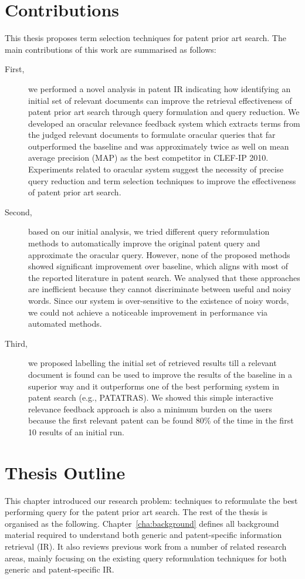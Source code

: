 \section{Contributions}
\label{sec:Contributions}
This thesis proposes term selection techniques for patent prior art search.
The main contributions of this work are summarised as follows:
\begin{description}
\item[First,] we performed a novel analysis in patent IR indicating how identifying 
an initial set of relevant documents can improve the retrieval effectiveness of 
patent prior art search through query formulation and query reduction. 
We developed an oracular relevance feedback system which extracts terms from the 
judged relevant documents to formulate oracular queries that far outperformed the 
baseline and  was approximately twice 
as well on mean average precision (MAP) as the best competitor in CLEF-IP 2010. 
Experiments related to oracular system suggest the necessity of precise query reduction 
and term selection techniques to improve the effectiveness of patent prior art search.
\item[Second,] based on our initial analysis, we tried different query reformulation methods to 
automatically improve the original patent query and approximate the oracular query. 
However, none of the proposed methods showed significant improvement over baseline, 
which aligns with most of the reported literature in patent search. 
We analysed that these approaches are inefficient because they cannot discriminate between 
useful and noisy words. Since our system is over-sensitive to the existence of noisy words, 
we could not achieve a noticeable improvement in performance via automated methods.
\item[Third,] we proposed labelling the initial set of retrieved results till a relevant document is 
found can be used to improve the results of the baseline in a superior way and it outperforms one of the 
best performing system in patent search (e.g., PATATRAS).
We showed this simple interactive relevance feedback approach is also a minimum burden on the users 
because the first relevant patent can be found 80\% of the time in the first 10 results of an initial run.
\end{description}
\section{Thesis Outline}
\label{sec:outline}
This chapter introduced our research problem: techniques to reformulate the best performing 
query for the patent prior art search. The rest of the thesis is organised as the following. 
Chapter~\ref{cha:background} defines all background material required to understand both 
generic and patent-specific information retrieval (IR). It also reviews previous work from a number
of related research areas, mainly focusing on the existing query reformulation techniques for both 
generic and patent-specific IR. 

